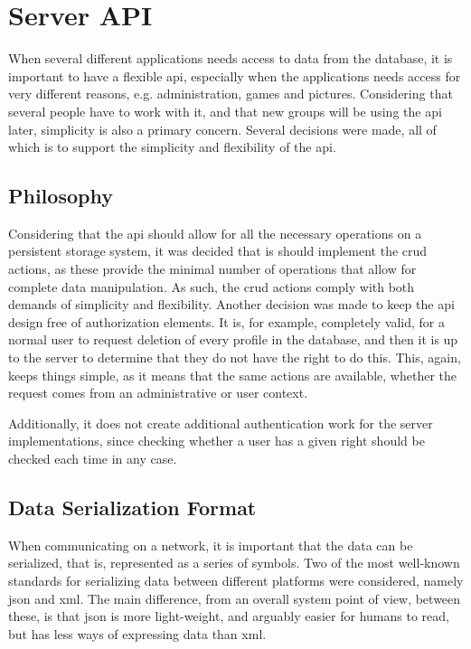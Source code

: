 \section{Server API}

When several different applications needs access to data from the database, it is important to have a flexible \ac{api}, especially when 
the applications needs access for very different reasons, e.g. administration, games and pictures. Considering that several people have to
work with it, and that new groups will be using the \ac{api} later, simplicity is also a primary concern. Several decisions were made, all of
which is to support the simplicity and flexibility of the \ac{api}.

\subsection{Philosophy}

Considering that the \ac{api} should allow for all the necessary operations on a persistent storage system, it was decided that is should
implement the \ac{crud} actions, as these provide the minimal number of operations that allow for complete data manipulation. \citep{crud13}
As such, the \ac{crud} actions comply with both demands of simplicity and flexibility.\p
Another decision was made to keep the \ac{api} design free of authorization elements. It is, for example, completely valid, for a normal user
to request deletion of every profile in the database, and then it is up to the server to determine that they do not have the right to do this.
This, again, keeps things simple, as it means that the same actions are available, whether the request comes from an administrative or
user context.

Additionally, it does not create additional authentication work for the server implementations, since checking whether a user has a given right
should be checked each time in any case.

\subsection{Data Serialization Format}

When communicating on a network, it is important that the data can be serialized, that is, represented as a series of symbols. Two of the most
well-known standards for serializing data between different platforms were considered, namely \ac{json} and \ac{xml}. The main difference, from
an overall system point of view, between these, is that \ac{json} is more light-weight, and arguably easier for humans to read, but has less 
ways of expressing data than \ac{xml}.

